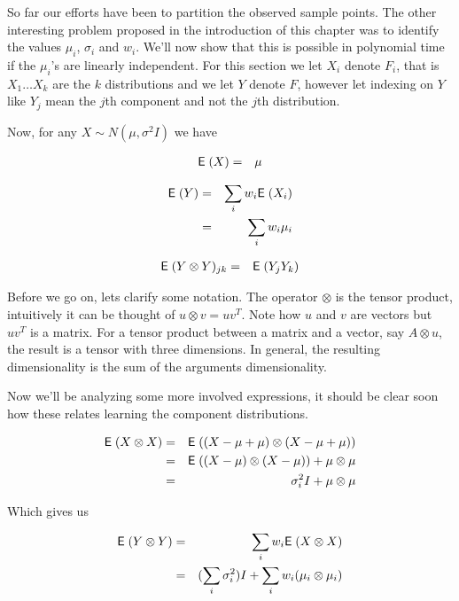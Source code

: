\documentclass{book}
\numberwithin{exercise}{chapter}
\begin{document}
So far our efforts have been to partition the observed sample points.
The other interesting problem proposed in the introduction of this
chapter was to identify the values $\mu_i$, $\sigma_i$ and $w_i$. We'll
now show that this is possible in polynomial time if the $\mu_i$'s are
linearly independent. For this section we let $X_i$ denote $F_i$,
that is $X_1 \dots X_k$ are the $k$ distributions and we let $Y$ denote
$F$, however let indexing on $Y$ like $Y_j$ mean the $j$th component and
not the $j$th distribution.

Now, for any $X \sim N(\mu, \sigma^2 I)$ we have

\begin{eqnarray*}
  \hbox{{\sf E}\;}(X) &=& \mu
\end{eqnarray*}

\begin{eqnarray*}
  \hbox{{\sf E}\;}(Y)
  &=& \sum_i w_i \hbox{{\sf E}\;}(X_i) \\
  &=& \sum_i w_i \mu_i
\end{eqnarray*}

\begin{eqnarray*}
  \hbox{{\sf E}\;}(Y \otimes Y)_{j k}
  &=& \hbox{{\sf E}\;}(Y_j Y_k)
\end{eqnarray*}

Before we go on, lets clarify some notation. The operator $\otimes$ is
the tensor product, intuitively it can be thought of $ u \otimes v = u
v^T $. Note how $u$ and $v$ are vectors but $u v^T$ is a matrix. For a
tensor product between a matrix and a vector, say $A \otimes u$, the
result is a tensor with three dimensions. In general, the resulting
dimensionality is the sum of the arguments dimensionality.

Now we'll be analyzing some more involved expressions, it should be clear
soon how these relates learning the component distributions.

\begin{eqnarray*}
  \hbox{{\sf E}\;}(X \otimes X)
  &=& \hbox{{\sf E}\;}((X-\mu+\mu) \otimes (X-\mu+\mu)) \\
  &=& \hbox{{\sf E}\;}((X-\mu) \otimes (X-\mu)) + \mu \otimes \mu \\
  &=& \sigma_i^2 I + \mu \otimes \mu
\end{eqnarray*}

Which gives us

\begin{eqnarray*}
  \hbox{{\sf E}\;}(Y \otimes Y)
  &=& \sum_i w_i \hbox{{\sf E}\;}(X \otimes X) \\
  &=& (\sum_i \sigma_i^2) I + \sum_i w_i (\mu_i \otimes \mu_i)
\end{eqnarray*}
\end{document}
